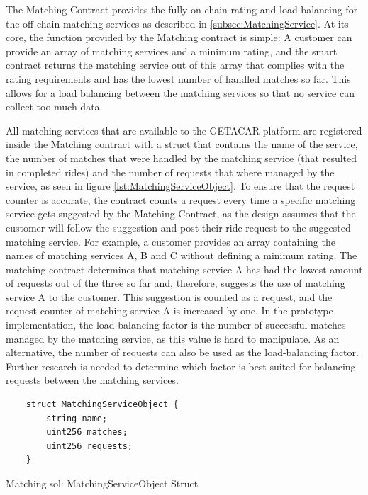 The Matching Contract provides the fully on-chain rating and load-balancing for the off-chain matching services as described in \ref{subsec:MatchingService}. At its core, the function provided by the Matching contract is simple: A customer can provide an array of matching services and a minimum rating, and the smart contract returns the matching service out of this array that complies with the rating requirements and has the lowest number of handled matches so far. This allows for a load balancing between the matching services so that no service can collect too much data.

All matching services that are available to the GETACAR platform are registered inside the Matching contract with a struct that contains the name of the service, the number of matches that were handled by the matching service (that resulted in completed rides) and the number of requests that where managed by the service, as seen in figure \ref{lst:MatchingServiceObject}. To ensure that the request counter is accurate, the contract counts a request every time a specific matching service gets suggested by the Matching Contract, as the design assumes that the customer will follow the suggestion and post their ride request to the suggested matching service. For example, a customer provides an array containing the names of matching services A, B and C without defining a minimum rating. The matching contract determines that matching service A has had the lowest amount of requests out of the three so far and, therefore, suggests the use of matching service A to the customer. This suggestion is counted as a request, and the request counter of matching service A is increased by one. In the prototype implementation, the load-balancing factor is the number of successful matches managed by the matching service, as this value is hard to manipulate. As an alternative, the number of requests can also be used as the load-balancing factor. Further research is needed to determine which factor is best suited for balancing requests between the matching services.

\lstset{
  basicstyle=\footnotesize\ttfamily,
  breaklines=true,
  numbers=left,
  firstnumber=6
}

\begin{Listing}
\begin{lstlisting}
    struct MatchingServiceObject {
        string name;
        uint256 matches;
        uint256 requests;
    }
\end{lstlisting}
  \caption{Matching.sol: MatchingServiceObject Struct}
  \label{lst:MatchingServiceObject}
\end{Listing}


